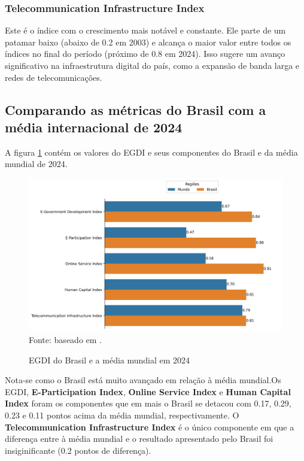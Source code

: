 \subsubsection{Telecommunication Infrastructure Index} Este é o índice com o crescimento mais notável e constante. Ele parte de um patamar baixo (abaixo de 0.2 em 2003) e alcança o maior valor entre todos os índices no final do período (próximo de 0.8 em 2024). Isso sugere um avanço significativo na infraestrutura digital do país, como a expansão de banda larga e redes de telecomunicações.

\subsection{Comparando as métricas do Brasil com a média internacional de 2024}

A figura \ref{fig:barplot_egdi_mediamundial_brasil} contém os valores do EGDI e seus componentes do Brasil e da média mundial de 2024.

\begin{figure}[H]
	\centering
	\caption{EGDI do Brasil e a média mundial em 2024}
	\includegraphics[width=1\linewidth]{figuras/egdi/barplot_egdi_mediamundial_brasil}
	\label{fig:barplot_egdi_mediamundial_brasil}
	\footnotesize{Fonte: baseado em \cite{ONU_EGDI_mapa}.}
\end{figure}

Nota-se como o Brasil está muito avançado em relação à média mundial.Os EGDI, \textbf{E-Participation Index}, \textbf{Online Service Index} e \textbf{Human Capital Index} foram os componentes que em mais o Brasil se detacou com 0.17, 0.29, 0.23 e 0.11 pontos acima da média mundial, respectivamente. O \textbf{Telecommunication Infrastructure Index} é o único componente em que a diferença entre à média mundial e o resultado apresentado pelo Brasil foi insiginificante (0.2 pontos de diferença).

